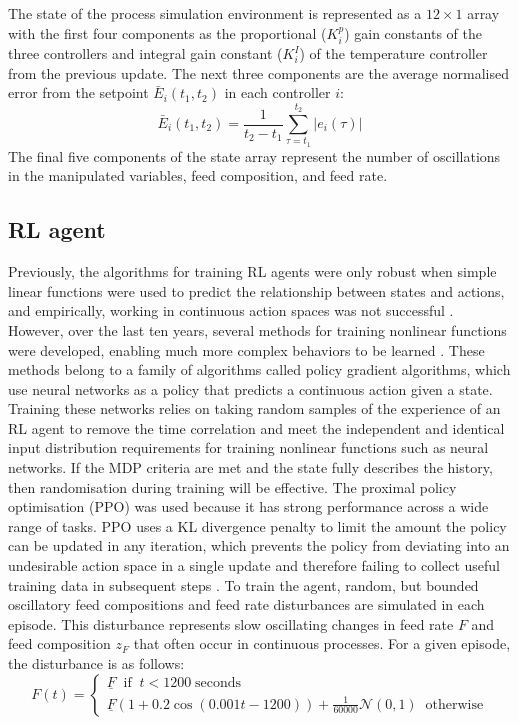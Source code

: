 The state of the process simulation environment is represented as a $12\times 1$ array with the first four components as the proportional ($K_i^p$) gain constants of the three controllers and integral gain constant ($K_i^I$) of the temperature controller from the previous update. The next three components are the average normalised error from the setpoint $\bar E_i(t_1,t_2)$ in each controller $i$:
\begin{equation}
	\bar E_i(t_1, t_2) =\frac{1}{t_2-t_1}\sum_{\tau=t_1}^{t_2} \lvert e_i(\tau) \rvert
\end{equation}
The final five components of the state array represent the number of oscillations in the manipulated variables, feed composition, and feed rate. 

\subsection{RL agent}
Previously, the algorithms for training RL agents were only robust when simple linear functions were used to predict the relationship between states and actions, and empirically, working in continuous action spaces was not successful \cite{Sutton2018}. However, over the last ten years, several methods for training nonlinear functions were developed, enabling much more complex behaviors to be learned \cite{Mnih2013, Lillicrap2016}. These methods belong to a family of algorithms called policy gradient algorithms, which use neural networks as a policy that predicts a continuous action given a state. Training these networks relies on taking random samples of the experience of an RL agent to remove the time correlation and meet the independent and identical input distribution requirements for training nonlinear functions such as neural networks. If the MDP criteria are met and the state fully describes the history, then randomisation during training will be effective. The proximal policy optimisation (PPO) was used \cite{Schulman2017} because it has strong performance across a wide range of tasks. PPO uses a KL divergence penalty to limit the amount the policy can be updated in any iteration, which prevents the policy from deviating into an undesirable action space in a single update and therefore failing to collect useful training data in subsequent steps \cite{Schulman2017, Engstrom2020}. To train the agent, random, but bounded oscillatory feed compositions and feed rate disturbances are simulated in each episode. This disturbance represents slow oscillating changes in feed rate $F$ and feed composition $z_F$ that often occur in continuous processes. For a given episode, the disturbance is as follows:
\begin{equation}
	F(t) = 
	\begin{cases}
		\underline F \;\; \text{if}\;\; t < 1200 \;\text{seconds} \\
		\underline F(1+ 0.2\cos(0.001t-1200))+\frac{1}{60000} \mathcal{N}(0,1) \;\; \text{otherwise}
	\end{cases}
\end{equation}

